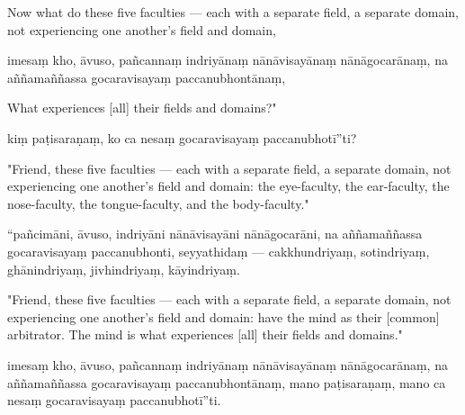 \begin{samepage}
\begin{leftcolumn*}
Now what do these five faculties — each with a separate field, a separate domain, not experiencing one another's field and domain,
\end{leftcolumn*}

\begin{rightcolumn}
imesaṃ kho, āvuso, pañcannaṃ indriyānaṃ nānāvisayānaṃ nānāgocarānaṃ, na aññamaññassa gocaravisayaṃ paccanubhontānaṃ,
\end{rightcolumn}
\end{samepage}

\begin{samepage}
\begin{leftcolumn*}
What experiences [all] their fields and domains?"
\end{leftcolumn*}

\begin{rightcolumn}
kiṃ paṭisaraṇaṃ, ko ca nesaṃ gocaravisayaṃ paccanubhotī”ti?
\end{rightcolumn}
\end{samepage}

\begin{samepage}
\begin{leftcolumn*}
"Friend, these five faculties — each with a separate field, a separate domain, not experiencing one another's field and domain: the eye-faculty, the ear-faculty, the nose-faculty, the tongue-faculty, and the body-faculty."
\end{leftcolumn*}

\begin{rightcolumn}
“pañcimāni, āvuso, indriyāni nānāvisayāni nānāgocarāni, na aññamaññassa gocaravisayaṃ paccanubhonti, seyyathidaṃ — cakkhundriyaṃ, sotindriyaṃ, ghānindriyaṃ, jivhindriyaṃ, kāyindriyaṃ.
\end{rightcolumn}
\end{samepage}

\begin{samepage}
\begin{leftcolumn*}
"Friend, these five faculties — each with a separate field, a separate domain, not experiencing one another's field and domain: have the mind as their [common] arbitrator. The mind is what experiences [all] their fields and domains."
\end{leftcolumn*}

\begin{rightcolumn}
imesaṃ kho, āvuso, pañcannaṃ indriyānaṃ nānāvisayānaṃ nānāgocarānaṃ, na aññamaññassa gocaravisayaṃ paccanubhontānaṃ, mano paṭisaraṇaṃ, mano ca nesaṃ gocaravisayaṃ paccanubhotī”ti.
\end{rightcolumn}
\end{samepage}

